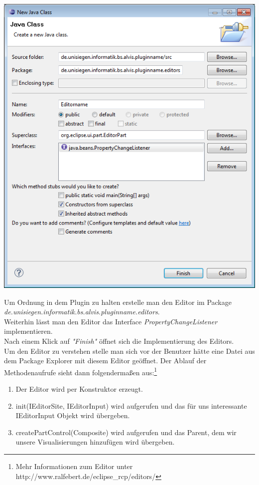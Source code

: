\documentclass[10pt,a4paper]{article}
\begin{document}
\begin{center}
\includegraphics[scale=0.485]{images/new_plugin_editor_01}
\end{center}

Um Ordnung in dem Plugin zu halten erstelle man den Editor im Package \textit{de.unisiegen.informatik.bs.alvis.pluginname.editors}.\\
Weiterhin lässt man den Editor das Interface \textit{PropertyChangeListener} implementieren.\\
Nach einem Klick auf \textit{"Finish"} öffnet sich die Implementierung des Editors. \\



Um den Editor zu verstehen stelle man sich vor der Benutzer hätte eine Datei aus dem Package Explorer mit diesem Editor geöffnet. Der Ablauf der Methodenaufrufe sieht dann folgendermaßen aus:\footnote{Mehr Informationen zum Editor unter http://www.ralfebert.de/eclipse\_rcp/editors/}
\begin{enumerate}
\item Der Editor wird per Konstruktor erzeugt.
\item init(IEditorSite, IEditorInput) wird aufgerufen und das für uns interessante IEditorInput Objekt wird übergeben. 
\item createPartControl(Composite) wird aufgerufen und das Parent, dem wir unsere Visualisierungen hinzufügen wird übergeben.
\end{enumerate}
\end{document}
